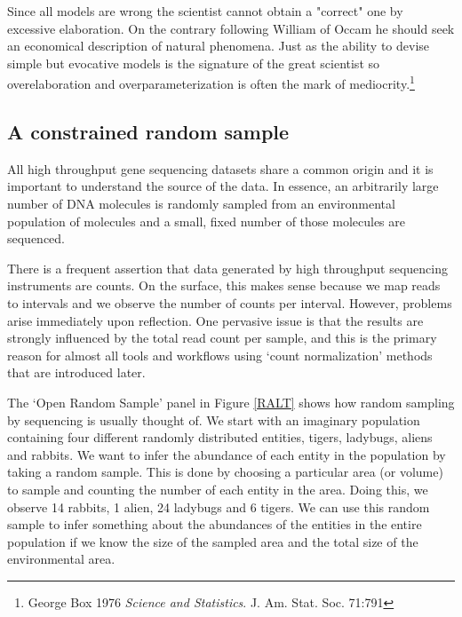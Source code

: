 \documentclass[
  onecolumn]{article}
\begin{document}
\hspace{2cm}\begin{minipage}[ct]{10cm}
\parskip=5pt
\parindent=5pt

Since all models are wrong the scientist cannot obtain a "correct" one by excessive elaboration. On the contrary following William of Occam he should seek an economical description of natural phenomena. Just as the ability to devise simple but evocative models is the signature of the great scientist so overelaboration and overparameterization is often the mark of mediocrity.\footnote{George Box 1976 \emph{Science and Statistics}. J. Am. Stat. Soc. 71:791}

\end{minipage}

\hypertarget{a-constrained-random-sample}{%
\subsection{A constrained random sample}\label{a-constrained-random-sample}}

All high throughput gene sequencing datasets share a common origin and it is important to understand the source of the data. In essence, an arbitrarily large number of DNA molecules is randomly sampled from an environmental population of molecules and a small, fixed number of those molecules are sequenced.

There is a frequent assertion that data generated by high throughput sequencing instruments are counts. On the surface, this makes sense because we map reads to intervals and we observe the number of counts per interval. However, problems arise immediately upon reflection. One pervasive issue is that the results are strongly influenced by the total read count per sample, and this is the primary reason for almost all tools and workflows using `count normalization' methods that are introduced later.

The `Open Random Sample' panel in Figure \ref{RALT} shows how random sampling by sequencing is usually thought of. We start with an imaginary population containing four different randomly distributed entities, tigers, ladybugs, aliens and rabbits. We want to infer the abundance of each entity in the population by taking a random sample. This is done by choosing a particular area (or volume) to sample and counting the number of each entity in the area. Doing this, we observe 14 rabbits, 1 alien, 24 ladybugs and 6 tigers. We can use this random sample to infer something about the abundances of the entities in the entire population if we know the size of the sampled area and the total size of the environmental area.
\end{document}
